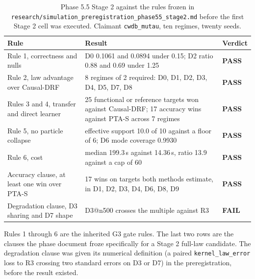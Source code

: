 \begin{table}[htbp]
\centering
\caption{Phase 5.5 Stage 2 against the rules frozen in \texttt{research/simulation\_preregistration\_phase55\_stage2.md} before the first Stage 2 cell was executed. Claimant \texttt{cwdb\_mutau}, ten regimes, twenty seeds.}
\label{tab:p55s2-gate}
\scriptsize
\setlength{\tabcolsep}{4pt}
\begin{tabular}{@{}p{}p{}l@{}}
\toprule
Rule & Result & Verdict \\
\midrule
Rule 1, correctness and nulls & D0 0.1061 and 0.0894 under 0.15; D2 ratio 0.88 and 0.69 under 1.25 & \textbf{PASS} \\
Rule 2, law advantage over Causal-DRF & 8 regimes of 2 required: D0, D1, D2, D3, D4, D5, D7, D8 & \textbf{PASS} \\
Rules 3 and 4, transfer and direct learner & 25 functional or reference targets won against Causal-DRF; 17 accuracy wins against PTA-S across 7 regimes & \textbf{PASS} \\
Rule 5, no particle collapse & effective support 10.0 of 10 against a floor of 6; D6 mode coverage 0.9930 & \textbf{PASS} \\
Rule 6, cost & median 199.3\,s against 14.36\,s, ratio 13.9 against a cap of 60 & \textbf{PASS} \\
Accuracy clause, at least one win over PTA-S & 17 wins on targets both methods estimate, in D1, D2, D3, D4, D6, D8, D9 & \textbf{PASS} \\
Degradation clause, D3 sharing and D7 shape & D3@n500 crosses the multiple against R3 & \textbf{FAIL} \\
\bottomrule
\end{tabular}
\par\vspace{2pt}\parbox{0.96\textwidth}{\scriptsize Rules 1 through 6 are the inherited G3 gate rules. The last two rows are the clauses the phase document froze specifically for a Stage 2 full-law candidate. The degradation clause was given its numerical definition (a paired \texttt{kernel\_law\_error} loss to R3 crossing two standard errors on D3 or D7) in the preregistration, before the result existed.}
\end{table}


